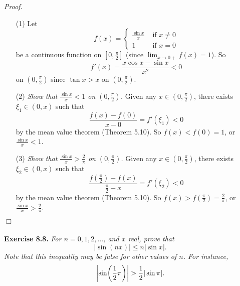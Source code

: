 \documentclass{article}
\begin{document}
\emph{Proof.}
\begin{enumerate}
\item[(1)]
Let
\begin{equation*}
  f(x) =
    \begin{cases}
      \frac{\sin x}{x} & \text{ if } x \neq 0 \\
      1                & \text{ if } x = 0
    \end{cases}
\end{equation*}
be a continuous function on $\left[ 0, \frac{\pi}{2} \right]$
(since $\lim_{x \to 0+} f(x) = 1$).
So
\[
  f'(x) = \frac{x \cos x - \sin x}{x^2} < 0
\]
on $\left( 0, \frac{\pi}{2} \right)$
since $\tan x > x$ on $\left( 0, \frac{\pi}{2} \right)$.

\item[(2)]
\emph{Show that $\frac{\sin x}{x} < 1$ on $\left( 0, \frac{\pi}{2} \right)$.}
Given any $x \in \left( 0, \frac{\pi}{2} \right)$, there exists $\xi_1 \in (0,x)$ such that
\[
  \frac{f(x) - f(0)}{x - 0} = f'(\xi_1) < 0
\]
by the mean value theorem (Theorem 5.10).
So $f(x) < f(0) = 1$,
or $\frac{\sin x}{x} < 1$.

\item[(3)]
\emph{Show that $\frac{\sin x}{x} > \frac{2}{\pi}$ on $\left( 0, \frac{\pi}{2} \right)$.}
Given any $x \in \left( 0, \frac{\pi}{2} \right)$, there exists $\xi_2 \in (0,x)$ such that
\[
  \frac{f(\frac{\pi}{2}) - f(x)}{\frac{\pi}{2} - x} = f'(\xi_2) < 0
\]
by the mean value theorem (Theorem 5.10).
So $f(x) > f(\frac{\pi}{2}) = \frac{2}{\pi}$,
or $\frac{\sin x}{x} > \frac{2}{\pi}$.
\end{enumerate}
$\Box$ \\\\






\textbf{Exercise 8.8.}
\emph{For $n=0,1,2,\ldots$, and $x$ real, prove that
\[
  |\sin(nx)| \leq n |\sin x|.
\]
Note that this inequality may be false for other values of $n$.
For instance,
\[
  \abs{ \sin(\frac{1}{2} \pi) } > \frac{1}{2}|\sin \pi|.
\]} \\
\end{document}
